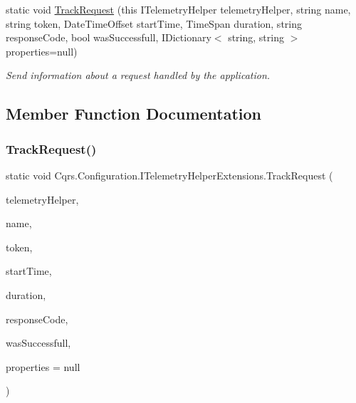 \begin{DoxyCompactItemize}
static void \hyperlink{classCqrs_1_1Configuration_1_1ITelemetryHelperExtensions_aba815675738eed8509d2ad4d327b591d}{Track\+Request} (this I\+Telemetry\+Helper telemetry\+Helper, string name, string token, Date\+Time\+Offset start\+Time, Time\+Span duration, string response\+Code, bool was\+Successfull, I\+Dictionary$<$ string, string $>$ properties=null)
\begin{DoxyCompactList}\small\item\em Send information about a request handled by the application. \end{DoxyCompactList}\end{DoxyCompactItemize}


\subsection{Member Function Documentation}
\mbox{\label{classCqrs_1_1Configuration_1_1ITelemetryHelperExtensions_a8e248c0990f9abd8f9d7f06a6e82c1d6}} 
\subsubsection{\texorpdfstring{Track\+Request()}{TrackRequest()}\hspace{0.1cm}{\footnotesize\ttfamily [1/3]}}
{\footnotesize\ttfamily static void Cqrs.\+Configuration.\+I\+Telemetry\+Helper\+Extensions.\+Track\+Request (\begin{DoxyParamCaption}\item[{this I\+Telemetry\+Helper}]{telemetry\+Helper,  }\item[{string}]{name,  }\item[{Guid?}]{token,  }\item[{Date\+Time\+Offset}]{start\+Time,  }\item[{Time\+Span}]{duration,  }\item[{string}]{response\+Code,  }\item[{bool}]{was\+Successfull,  }\item[{I\+Dictionary$<$ string, string $>$}]{properties = {\ttfamily null} }\end{DoxyParamCaption})\hspace{0.3cm}{\ttfamily [static]}}



